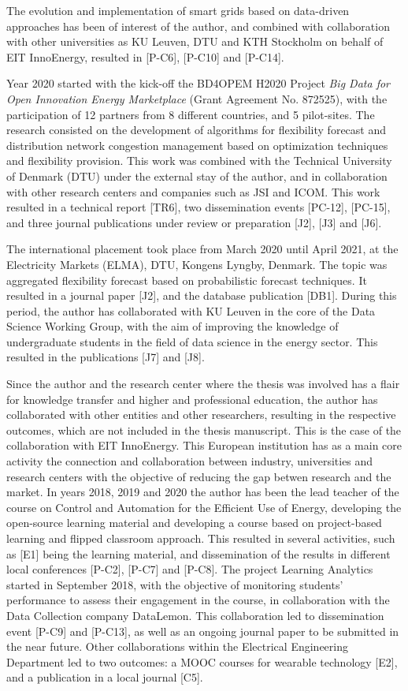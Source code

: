 The evolution and implementation of smart grids based on data-driven approaches has been of interest of the author, and combined with collaboration with other universities as KU Leuven, DTU and KTH Stockholm on behalf of EIT InnoEnergy, resulted in [P-C6], [P-C10] and [P-C14]. 

Year 2020 started with the kick-off the BD4OPEM H2020 Project \textit{Big Data for Open Innovation Energy Marketplace} (Grant Agreement No. 872525), with the participation of 12 partners from 8 different countries, and 5 pilot-sites. The research consisted on the development of algorithms for flexibility forecast and distribution network congestion management based on optimization techniques and flexibility provision. This work was combined with the Technical University of Denmark (DTU) under the external stay of the author, and in collaboration with other research centers and companies such as JSI and ICOM. This work resulted in a technical report [TR6], two dissemination events [PC-12], [PC-15], and three journal publications under review or preparation [J2], [J3] and [J6].  

The international placement took place from March 2020 until April 2021, at the Electricity Markets (ELMA), DTU, Kongens Lyngby, Denmark. The topic was aggregated flexibility forecast based on probabilistic forecast techniques. It resulted in a journal paper [J2], and the database publication [DB1]. During this period, the author has collaborated with KU Leuven in the core of the Data Science Working Group, with the aim of improving the knowledge of undergraduate students in the field of data science in the energy sector. This resulted in the publications [J7] and [J8]. 

Since the author and the research center where the thesis was involved has a flair for knowledge transfer and higher and professional education, the author has collaborated with other entities and other researchers, resulting in the respective outcomes, which are not included in the thesis manuscript. This is the case of the collaboration with EIT InnoEnergy. This European institution has as a main core activity the connection and collaboration between industry, universities and research centers with the objective of reducing the gap betwen research and the market. In years 2018, 2019 and 2020 the author has been the lead teacher of the course on Control and Automation for the Efficient Use of Energy, developing the open-source learning material and developing a course based on project-based learning and flipped classroom approach. This resulted in several activities, such as [E1] being the learning material, and dissemination of the results in different local conferences [P-C2], [P-C7] and [P-C8]. The project Learning Analytics started in September 2018, with the objective of monitoring students' performance to assess their engagement in the course, in collaboration with the Data Collection company DataLemon. This collaboration led to dissemination event [P-C9] and [P-C13], as well as an ongoing journal paper to be submitted in the near future. Other collaborations within the Electrical Engineering Department led to two outcomes: a MOOC courses for wearable technology [E2], and a publication in a local journal [C5]. 


